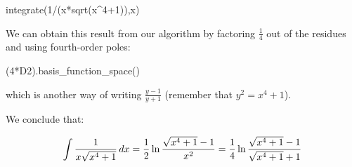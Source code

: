 \begin{sageblock}[geddes]
integrate(1/(x*sqrt(x^4+1)),x)
\end{sageblock}

We can obtain this result from our algorithm by factoring $\frac{1}{4}$ out
of the residues and using fourth-order poles:

\begin{sageblock}[geddes]
(4*D2).basis_function_space()
\end{sageblock}

which is another way of writing $\frac{y-1}{y+1}$ (remember
that $y^2 = x^4+1$).

We conclude that:

$$\int {1\over{x\sqrt{x^4+1}}} \, dx
={1\over2} \ln {{\sqrt{x^4+1}-1}\over{x^2}}
={1\over4} \ln {{\sqrt{x^4+1}-1}\over{\sqrt{x^4+1}+1}}$$

\endexample

